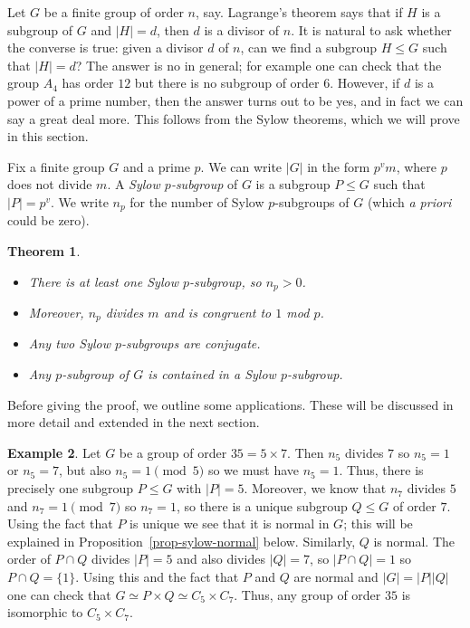 \documentclass{amsart}
\newcommand{\tm}        {\times}
\renewcommand{\:}{\colon}
\newtheorem{theorem}{Theorem}[section]
\theoremstyle{definition}
\newtheorem{example}[theorem]{Example}
\begin{document}
Let $G$ be a finite group of order $n$, say.  Lagrange's theorem says
that if $H$ is a subgroup of $G$ and $|H|=d$, then $d$ is a divisor of
$n$.  It is natural to ask whether the converse is true: given a
divisor $d$ of $n$, can we find a subgroup $H\leq G$ such that
$|H|=d$?  The answer is no in general; for example one can check that
the group $A_4$ has order $12$ but there is no subgroup of order $6$.
However, if $d$ is a power of a prime number, then the answer turns
out to be yes, and in fact we can say a great deal more.  This follows
from the Sylow theorems, which we will prove in this section.

Fix a finite group $G$ and a prime $p$.  We can write $|G|$ in the
form $p^vm$, where $p$ does not divide $m$.  A \emph{Sylow
$p$-subgroup} of $G$ is a subgroup $P\leq G$ such that $|P|=p^v$.  We
write $n_p$ for the number of Sylow $p$-subgroups of $G$ (which
\emph{a priori} could be zero).

\begin{theorem}\label{thm-sylow}
 \begin{itemize}
 \item[(a)] There is at least one Sylow $p$-subgroup, so $n_p>0$.
 \item[(b)] Moreover, $n_p$ divides $m$ and is congruent to $1$ mod
  $p$.
 \item[(c)] Any two Sylow $p$-subgroups are conjugate.
 \item[(d)] Any $p$-subgroup of $G$ is contained in a Sylow
  $p$-subgroup.
 \end{itemize}
\end{theorem}

Before giving the proof, we outline some applications.  These will be
discussed in more detail and extended in the next section.

\begin{example}
 Let $G$ be a group of order $35=5\tm 7$.  Then $n_5$ divides $7$ so
 $n_5=1$ or $n_5=7$, but also $n_5=1\pmod{5}$ so we must have $n_5=1$.
 Thus, there is precisely one subgroup $P\leq G$ with $|P|=5$.
 Moreover, we know that $n_7$ divides $5$ and $n_7=1\pmod{7}$ so
 $n_7=1$, so there is a unique subgroup $Q\leq G$ of order $7$.  Using
 the fact that $P$ is unique we see that it is normal in $G$; this
 will be explained in Proposition~\ref{prop-sylow-normal} below.
 Similarly, $Q$ is normal.  The order of $P\cap Q$ divides $|P|=5$ and
 also divides $|Q|=7$, so $|P\cap Q|=1$ so $P\cap Q=\{1\}$.  Using
 this and the fact that $P$ and $Q$ are normal and $|G|=|P||Q|$ one
 can check that $G\simeq P\tm Q\simeq C_5\tm C_7$.  Thus, any group
 of order $35$ is isomorphic to $C_5\tm C_7$.
\end{example}
\end{document}
